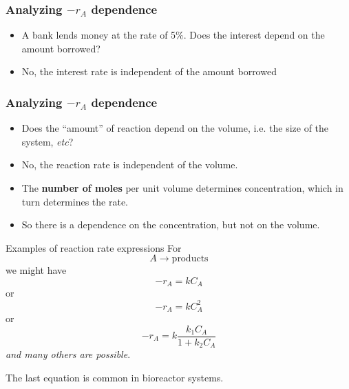 \begin{frame}\frametitle{Analyzing $-r_A$ dependence} 
	\begin{itemize}
		\item	 A bank lends money at the rate of 5\%. Does the interest depend on the amount borrowed? 
		\item	 No, the interest rate is independent of the amount borrowed
	\end{itemize}
\end{frame}

\begin{frame}\frametitle{Analyzing $-r_A$ dependence} 
	\begin{itemize}
		\item	Does the ``amount'' of reaction depend on the volume, i.e. the size of the system, \emph{etc}? 
		\item	No, the reaction rate is independent of the volume.
		\item	The \textbf{number of moles} per unit volume determines concentration, which in turn determines the rate.
		\item	So there is a dependence on the concentration, but not on the volume. 
	\end{itemize}
\end{frame}


\begin{frame}{Examples of reaction rate expressions}
	For $$A\longrightarrow\text{products}$$ we might have 
	$$-r_A = kC_A$$ or 
	$$-r_A = kC_A^2$$ or 
	$$-r_A = k\frac{k_1C_A}{1 + k_2C_A}$$
	\emph{and many others are possible}.
	
	\vspace{12pt}
	The last equation is common in bioreactor systems.
\end{frame}

